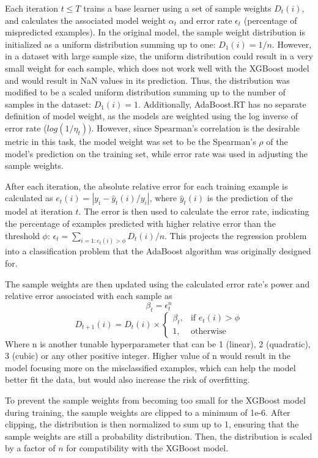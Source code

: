 Each iteration $t\leq T$ trains a base learner using a set of sample weights $D_t(i)$, and calculates the associated model weight $\alpha_t$ and error rate $\epsilon_t$ (percentage of mispredicted examples).
In the original model, the sample weight distribution is initialized as a uniform distribution summing up to one: $D_1(i) = 1/n$. However, in a dataset with large sample size, the uniform distribution could result in a very small weight for each sample, which does not work well with the XGBoost model and would result in NaN values in its prediction. Thus, the distribution was modified to be a scaled uniform distribution summing up to the number of samples in the dataset: $D_1(i) = 1$. Additionally, AdaBoost.RT has no separate definition of model weight, as the models are weighted using the log inverse of error rate ($log(1/\eta_t)$). However, since Spearman's correlation is the desirable metric in this task, the model weight was set to be the Spearman's $\rho$ of the model's prediction on the training set, while error rate was used in adjusting the sample weights.

After each iteration, the absolute relative error for each training example is calculated as $e_t(i) = |y_i - \hat{y}_t(i)/y_i|$, where $\hat{y}_t(i)$ is the prediction of the model at iteration $t$. The error is then used to calculate the error rate, indicating the percentage of examples predicted with higher relative error than the threshold $\phi$: $\epsilon_t = \sum_{i=1: e_t(i) > \phi} D_t(i) / n$. This projects the regression problem into a classification problem that the AdaBoost algorithm was originally designed for.

The sample weights are then updated using the calculated error rate's power and relative error associated with each sample as 
$$
\beta_t = \epsilon_t ^ n
$$
$$
D_{t+1}(i) = D_t(i) \times \begin{cases}
    \beta_t, & \text{if } e_t(i) > \phi \\
    1, & \text{otherwise}
\end{cases}
$$
Where n is another tunable hyperparameter that can be 1 (linear), 2 (quadratic), 3 (cubic) or any other positive integer. Higher value of n would result in the model focusing more on the misclassified examples, which can help the model better fit the data, but would also increase the risk of overfitting.

To prevent the sample weights from becoming too small for the XGBoost model during training, the sample weights are clipped to a minimum of 1e-6. After clipping, the distribution is then normalized to sum up to 1, ensuring that the sample weights are still a probability distribution. Then, the distribution is scaled by a factor of $n$ for compatibility with the XGBoost model.

